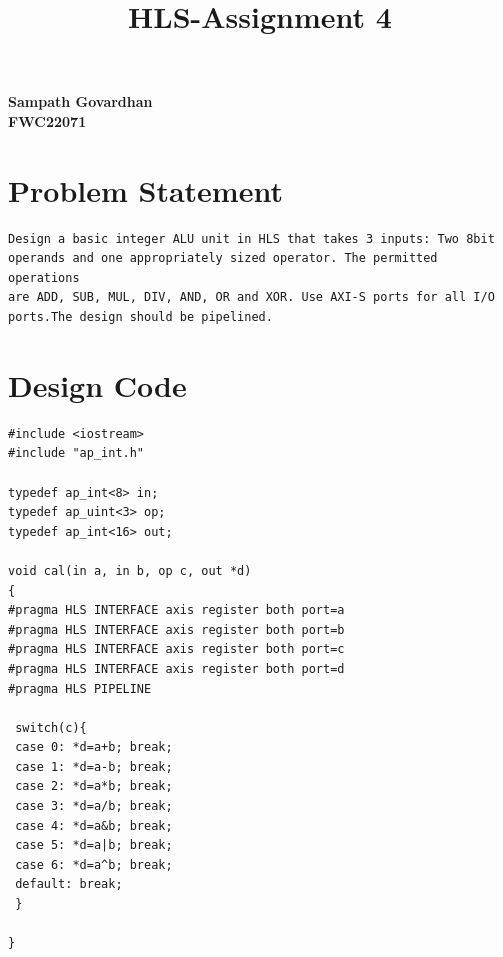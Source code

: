 \documentclass{article}
\title{
HLS-Assignment 4
}
\begin{document}
\maketitle
\hfill \textbf{Sampath Govardhan} \\
\null \hfill \textbf{FWC22071}\\

\section{Problem Statement}
\begin{lstlisting}
Design a basic integer ALU unit in HLS that takes 3 inputs: Two 8bit 
operands and one appropriately sized operator. The permitted operations 
are ADD, SUB, MUL, DIV, AND, OR and XOR. Use AXI-S ports for all I/O 
ports.The design should be pipelined.
\end{lstlisting}
\vspace{10cm}


\section{Design Code}
\begin{lstlisting}
#include <iostream>
#include "ap_int.h"

typedef ap_int<8> in;
typedef ap_uint<3> op;
typedef ap_int<16> out;

void cal(in a, in b, op c, out *d)
{
#pragma HLS INTERFACE axis register both port=a
#pragma HLS INTERFACE axis register both port=b
#pragma HLS INTERFACE axis register both port=c
#pragma HLS INTERFACE axis register both port=d
#pragma HLS PIPELINE

 switch(c){
 case 0: *d=a+b; break;
 case 1: *d=a-b; break;
 case 2: *d=a*b; break;
 case 3: *d=a/b; break;
 case 4: *d=a&b; break;
 case 5: *d=a|b; break;
 case 6: *d=a^b; break;
 default: break;
 }

}



\end{lstlisting}
\vspace{5cm}
\end{document}
